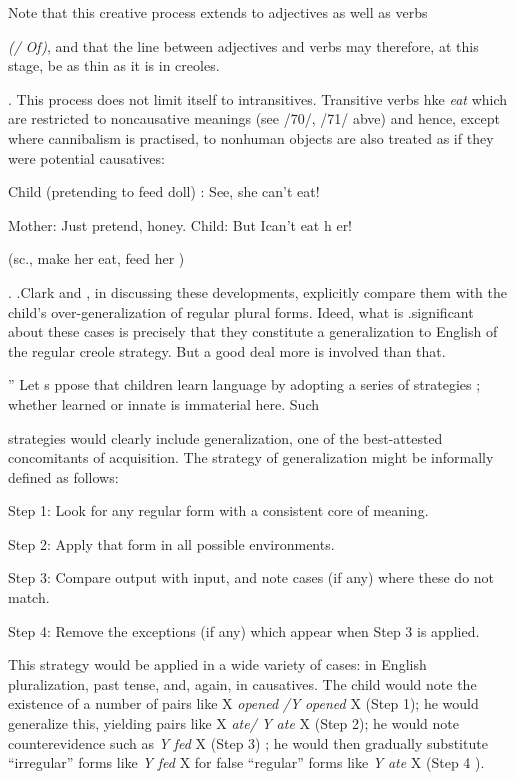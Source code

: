 Note that this creative process extends to adjectives as well as verbs

\textit{(/} \textit{Of}\textit{)}, and that the line between adjectives and verbs may therefore, at this stage, be as thin as it is in creoles.

. This process does not limit itself to intransitives. Transitive verbs hke \textit{eat} which are restricted to noncausative meanings (see /70/, /71/ abve) and hence, except where cannibalism is practised, to nonhuman objects are also treated as if they were potential causatives:

\ea\label{ex:81}
 Child (pretending to feed doll) : See, she can't eat!
\glt
\z

Mother: Just pretend, honey. Child: But Ican't eat h er!

(sc., make her eat, feed her )

. .Clark and \citet[511]{Clark1977}, in discussing these developments, explicitly compare them with the child's over-generalization of regular plural forms. Ideed, what is .significant about these cases is precisely that they constitute a generalization to English of the regular creole strategy. But a good deal more is involved than that.

'' Let s ppose that children learn language by adopting a series of strategies ; whether learned or innate is immaterial here. Such


strategies would clearly include generalization, one of the best-attested concomitants of acquisition. The strategy of generalization might be informally defined as follows:

Step 1: Look for any regular form with a consistent core of meaning.

Step 2: Apply that form in all possible environments.

Step 3: Compare output with input, and note cases (if any) where these do not match.

Step 4: Remove the exceptions (if any) which appear when Step 3 is applied.

This strategy would be applied in a wide variety of cases: in English pluralization, past tense, and, again, in causatives. The child would note the existence of a number of pairs like X \textit{o}\textit{pened} \textit{/Y} \textit{opened} X (Step 1); he would generalize this, yielding pairs like X \textit{ate}\textit{/} \textit{Y} \textit{ate} X (Step 2); he would note counterevidence such as \textit{Y} \textit{fed }X (Step 3) ; he would then gradually substitute ``irregular'' forms like \textit{Y fed }X for false ``regular'' forms like \textit{Y} \textit{ate} X (Step 4 ).

